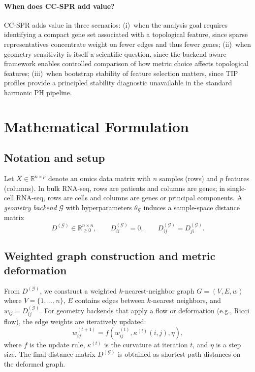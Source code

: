 \documentclass[11pt]{article}
\begin{document}
\paragraph{When does CC-SPR add value?}
CC-SPR adds value in three scenarios:
(i)~when the analysis goal requires identifying a compact gene set associated with a topological feature, since sparse representatives concentrate weight on fewer edges and thus fewer genes;
(ii)~when geometry sensitivity is itself a scientific question, since the backend-aware framework enables controlled comparison of how metric choice affects topological features;
(iii)~when bootstrap stability of feature selection matters, since TIP profiles provide a principled stability diagnostic unavailable in the standard harmonic PH pipeline.

\section{Mathematical Formulation}
\label{sec:math}

\subsection{Notation and setup}

Let $X \in \mathbb{R}^{n \times p}$ denote an omics data matrix with $n$ samples (rows) and $p$ features (columns).
In bulk RNA-seq, rows are patients and columns are genes; in single-cell RNA-seq, rows are cells and columns are genes or principal components.
A \emph{geometry backend} $\mathcal{G}$ with hyperparameters $\theta_{\mathcal{G}}$ induces a sample-space distance matrix
\[
D^{(\mathcal{G})} \in \mathbb{R}_{\ge 0}^{n \times n}, \qquad D^{(\mathcal{G})}_{ii}=0, \qquad D^{(\mathcal{G})}_{ij} = D^{(\mathcal{G})}_{ji}.
\]

\subsection{Weighted graph construction and metric deformation}

From $D^{(\mathcal{G})}$, we construct a weighted $k$-nearest-neighbor graph $G = (V, E, w)$ where $V = \{1, \ldots, n\}$, $E$ contains edges between $k$-nearest neighbors, and $w_{ij} = D^{(\mathcal{G})}_{ij}$.
For geometry backends that apply a flow or deformation (e.g., Ricci flow), the edge weights are iteratively updated:
\[
w_{ij}^{(t+1)} = f(w_{ij}^{(t)}, \kappa^{(t)}(i,j), \eta),
\]
where $f$ is the update rule, $\kappa^{(t)}$ is the curvature at iteration $t$, and $\eta$ is a step size.
The final distance matrix $D^{(\mathcal{G})}$ is obtained as shortest-path distances on the deformed graph.
\end{document}
